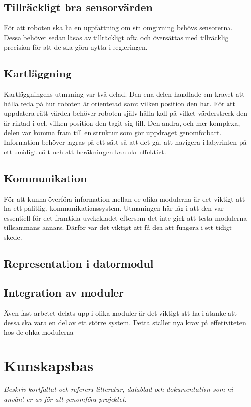 \documentclass[11pt]{article}
\begin{document}
\begin{flushleft}
\subsection{Tillräckligt bra sensorvärden}
För att roboten ska ha en uppfattning om sin omgivning behövs sensorerna. Dessa behöver sedan läsas av tillräckligt ofta och översättas med tillräcklig precision för att de ska göra nytta i regleringen. 

\subsection{Kartläggning}
Kartläggningens utmaning var två delad. Den ena delen handlade om kravet att hålla reda på hur roboten är orienterad samt vilken position den har. För att uppdatera rätt värden behöver roboten själv hålla koll på vilket värderstreck den är riktad i och vilken position den tagit sig till. Den andra, och mer komplexa, delen var komma fram till en struktur som gör uppdraget genomförbart. Information behöver lagras på ett sätt så att det går att navigera i labyrinten på ett smidigt sätt och att beräkningen kan ske effektivt.

\subsection{Kommunikation}
För att kunna överföra information mellan de olika modulerna är det viktigt att ha ett pålitligt kommunikationssystem. Utmaningen här låg i att den var essentiell för det framtida uvekckladet eftersom det inte gick att testa modulerna tillsammans annars. Därför var det viktigt att få den att fungera i ett tidigt skede.

\subsection{Representation i datormodul}

\subsection{Integration av moduler}
Även fast arbetet delats upp i olika moduler är det viktigt att ha i åtanke att dessa ska vara en del av ett större system. Detta ställer nya krav på effetiviteten hos de olika modulerna

\pagebreak

\section{Kunskapsbas}
\textit{Beskriv kortfattat och referera litteratur, datablad och dokumentation som ni använt er av för att genomföra projektet.}


\end{flushleft}
\end{document}

